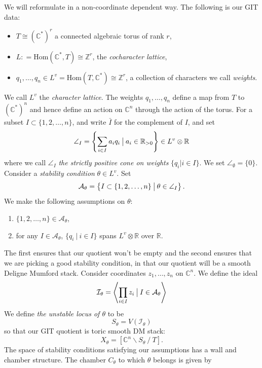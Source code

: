 \documentclass[oneside,reqno]{amsart}
\theoremstyle{definition}
\theoremstyle{definition}
\theoremstyle{definition}
\theoremstyle{definition}
\newcommand{\defeq}{\mathrel{\mathop:}=}
\newcommand{\CC}{\mathbb{C}}
\newcommand{\Z}{\mathbb{Z}}
\begin{document}
\newline
We will reformulate in a non-coordinate dependent way. The following is our GIT data:
\begin{itemize}
    \item $T \cong (\CC^*)^r$ a connected algebraic torus of rank $r$,
    \item $L \defeq \text{Hom}(\CC^*,T) \cong \Z^r$, the \textit{cocharacter lattice},
    \item $q_1, \dots, q_n \in L^v = \text{Hom}(T, \CC^*) \cong \Z^r $, a collection of characters we call \textit{weights}.
\end{itemize}
We call $L^v$ the \textit{character lattice}. The weights $q_1, \dots,q_n$ define a map from $T$ to $(\CC^*)^n$ and hence define an action on $\CC^n$ through the action of the torus. For a subset $I \subset \{1, 2, \dots , n\}$, and write $\bar{I}$ for the complement of $I$, and set
\begin{align}
    \angle_I =\left\{ \sum_{i\in I} a_i q_i \: \big{|} 
    \: a_i \in \mathbb{R}_{>0} \right\} \in L^v \otimes \mathbb{R}
\end{align}
where we call $\angle_I$ \textit{the strictly positive cone on weights} $\{q_i| i \in I \}$. We set $\angle_\emptyset = \{0 \}$. Consider a \textit{stability condition} $\theta \in L^v$. Set
$$
\mathcal{A}_\theta = \left\{ I \subset \{1,2,\dots,n \} \: \big{|} \: \theta \in \angle_{I}\right\}.
$$
We make the following assumptions on $\theta$:
\begin{enumerate}
    \item $\{1,2, \dots, n\} \in \mathcal{A}_\theta $,
    \item for any $I \in \mathcal{A}_\theta $, $\{q_i \: |\: i \in I \}$ spans $L^v \otimes \mathbb{R}$ over $\mathbb{R}.$
\end{enumerate}
The first ensures that our quotient won't be empty and the second ensures that we are picking a good stability condition, in that our quotient will be a smooth Deligne Mumford stack. Consider coordinates $z_1,\dots, z_n$ on $\CC^n$. We define the ideal 
$$
\mathcal{I}_{\theta} = \left\langle \prod_{i \in I} z_i  \: \big{|} \: I \in \mathcal{A}_{\theta} \right\rangle
$$
We define \textit{the unstable locus of $\theta$} to be 
$$
S_{\theta} = V(\mathcal{I}_{\theta})
$$
so that our GIT quotient is toric smooth DM stack:
$$
X_{\theta} = [ \CC^n \backslash S_\theta \: / \: T ].
$$
The space of stability conditions satisfying our assumptions has a wall and chamber structure. The chamber $C_\theta$ to which $\theta$ belongs is given by
\end{document}
